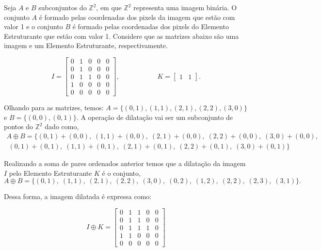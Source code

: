\begin{exemplo}
	Seja $A$ e $B$ subconjuntos do $\mathbb{Z}^2$, em que $\mathbb{Z}^2$ representa uma imagem binária. O conjunto $A$ é formado pelas coordenadas dos pixels da imagem que estão com valor 1 e o conjunto $B$ é formado pelas coordenadas dos pixels do Elemento Estruturante que estão com valor 1. Considere que as matrizes abaixo são uma imagem e um Elemento Estruturante, respectivamente.
	
	\begin{equation}
		I = \begin{bmatrix}
			0 & 1 & 0 & 0 & 0 \\
			0 & 1 & 0 & 0 & 0 \\
			0 & 1 & 1 & 0 & 0 \\
			1 & 0 & 0 & 0 & 0 \\
			0 & 0 & 0 & 0 & 0
		\end{bmatrix}, \; \; \; \; \; \; \; \; \; \; \; \; \; \; \; \; \; \; \; \;
		K = \begin{bmatrix}
			1 & 1
		\end{bmatrix}.
	\end{equation}
	
	\noindent Olhando para as matrizes, temos: $A = \{(0,1), (1,1), (2,1), (2,2), (3,0)\}$ e $B = \{(0,0), (0,1)\}$. A operação de dilatação vai ser um subconjunto de pontos do $\mathbb{Z}^2$ dado como,
	\begin{multline}
		A \oplus B = \{(0,1) + (0,0), \; (1,1) + (0,0), \; (2,1) + (0,0), \; (2,2) + (0,0), \; (3,0) + (0,0), \\ 
		\; (0,1) + (0,1), \; (1,1) + (0,1), \; (2,1) + (0,1), \; (2,2) + (0,1), \; (3,0) + (0,1)\}
	\end{multline}
	
	\noindent Realizando a soma de pares ordenados anterior temos que a dilatação da imagem $I$ pelo Elemento Estruturante $K$ é o conjunto, 
	\begin{equation}
		A \oplus B = \{(0,1), \; (1,1), \; (2,1), \; (2,2), \; (3,0), \; (0,2), \; (1,2), \; (2,2), \; (2,3), \; (3,1)\}.
	\end{equation}
	
	\noindent Dessa forma, a imagem dilatada é expressa como: 
	
	\begin{equation}
		I \oplus K = \begin{bmatrix}
			0 & 1 & 1 & 0 & 0\\
			0 & 1 & 1 & 0 & 0\\
			0 & 1 & 1 & 1 & 0\\
			1 & 1 & 0 & 0 & 0\\
			0 & 0 & 0 & 0 & 0
		\end{bmatrix}
	\end{equation}
\end{exemplo}

